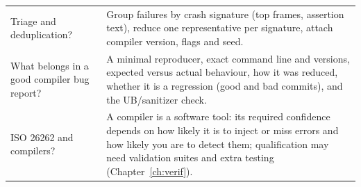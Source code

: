 \documentclass[10pt,a4paper,openany,oneside]{report}
\begin{document}
\begin{center}
\begin{xltabular}{\textwidth}{@{}L{4.6cm}Y@{}}
Triage and deduplication? & Group failures by crash signature (top frames, assertion text), reduce one representative per signature, attach compiler version, flags and seed.\\
What belongs in a good compiler bug report? & A minimal reproducer, exact command line and versions, expected versus actual behaviour, how it was reduced, whether it is a regression (good and bad commits), and the UB/sanitizer check.\\
ISO 26262 and compilers? & A compiler is a software tool: its required confidence depends on how likely it is to inject or miss errors and how likely you are to detect them; qualification may need validation suites and extra testing (Chapter~\ref{ch:verif}).\\
\bottomrule
\end{xltabular}
\end{center}
\end{document}
